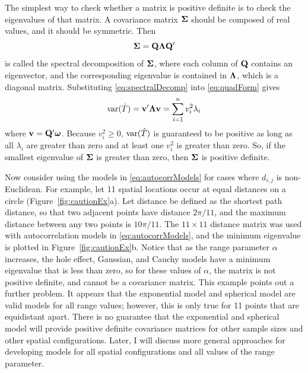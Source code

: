 \documentclass[11pt, titlepage]{article}\usepackage[]{graphicx}\usepackage[]{color}
\begin{document}
\begin{spacing}{1.9}
\begin{flushleft}
The simplest way to check whether a matrix is positive definite is to check the eigenvalues of that matrix.  A covariance matrix $\mbox{\boldmath $\Sigma$}$ should be composed of real values, and it should be symmetric.  Then 
\begin{equation} \label{eq:spectralDecomp}
  \mbox{\boldmath $\Sigma$} = \mathbf{Q}\mbox{\boldmath $\Lambda$}\mathbf{Q}^{\prime}
\end{equation}
is called the spectral decomposition of $\mbox{\boldmath $\Sigma$}$, where each column of $\mathbf{Q}$ contains an eigenvector, and the corresponding eigenvalue is contained in $\mbox{\boldmath $\Lambda$}$, which is a diagonal matrix.  Substituting \ref{eq:spectralDecomp} into \ref{eq:quadForm} gives
\[
\textrm{var}(\hat{T}) = \mathbf{v}^{\prime}\mbox{\boldmath $\Lambda$}\mathbf{v} = \sum_{i=1}^n v_i^2\lambda_i
\]
where $\mathbf{v} = \mathbf{Q}^{\prime}\mbox{\boldmath $\omega$}$. Because $v_i^2 \ge 0$, $\textrm{var}(\hat{T})$ is guaranteed to be positive as long as all $\lambda_i$ are greater than zero and at least one $v_i^2$ is greater than zero.  So, if the smallest eigenvalue of $\mbox{\boldmath $\Sigma$}$ is greater than zero, then $\mbox{\boldmath $\Sigma$}$ is positive definite.

Now consider using the models in \ref{eq:autocorrModels} for cases where $d_{i,j}$ is non-Euclidean.  For example, let 11 spatial locations occur at equal distances on a circle (Figure~\ref{fig:cautionEx}a).  Let distance be defined as the shortest path distance, so that two adjacent points have distance $2\pi/11$, and the maximum distance between any two points is $10\pi/11$.  The $11 \times 11$ distance matrix was used with autocorrelation models in \ref{eq:autocorrModels}, and the minimum eigenvalue is plotted in Figure~\ref{fig:cautionEx}b.  Notice that as the range parameter $\alpha$ increases, the hole effect, Gaussian, and Cauchy models have a minimum eigenvalue that is less than zero, so for these values of $\alpha$, the matrix is not positive definite, and cannot be a covariance matrix. This example points out a further problem.  It appears that the exponential model and spherical model are valid models for all range values; however, this is only true for 11 points that are equidistant apart.  There is no guarantee that the exponential and spherical model will provide positive definite covariance matrices for other sample sizes and other spatial configurations.  Later, I will discuss more general approaches for developing models for all spatial configurations and all values of the range parameter.


\end{flushleft}
\end{spacing}
\end{document}
